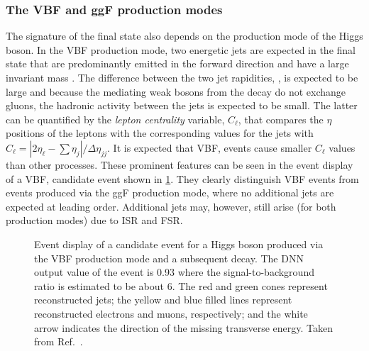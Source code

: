 \subsubsection{The VBF and ggF production modes}
The signature of the final state also depends on the production mode of the Higgs boson.
In the VBF production mode, two energetic jets are expected in the final state that are predominantly emitted in the forward direction and have a large invariant mass \mjj. 
The difference between the two jet rapidities, \dyjj, is expected to be large and because the mediating weak bosons from the \HWW decay do not exchange gluons, the hadronic activity between the jets is expected to be small. 
The latter can be quantified by the \emph{lepton centrality} variable, $C_\ell$, that compares the $\eta$ positions of the leptons with the corresponding values for the jets with $C_\ell = |2\eta_\ell - \sum \eta_j| / \Delta \eta_{jj}$. It is expected that VBF, \HWW events cause smaller $C_\ell$ values than other processes.
These prominent features can be seen in the event display of a VBF, \HWW candidate event shown in \cref{fig:vbf-event-display}. 
They clearly distinguish VBF events from events produced via the ggF production mode, where no additional jets are expected at leading order. 
Additional jets may, however, still arise (for both production modes) due to ISR and FSR. 

\begin{figure}
    \caption{Event display of a candidate event for a Higgs boson produced via the VBF production mode and a subsequent \HWWdet decay. The DNN output value of the event is 0.93 where the signal-to-background ratio is estimated to be about 6. 
    The red and green cones represent reconstructed jets; the yellow and blue filled lines represent reconstructed electrons and muons, respectively; and the white arrow indicates the direction of the missing transverse energy. 
    Taken from Ref.~\cite{HWWPaper}.}
    \label{fig:vbf-event-display}
\end{figure}

